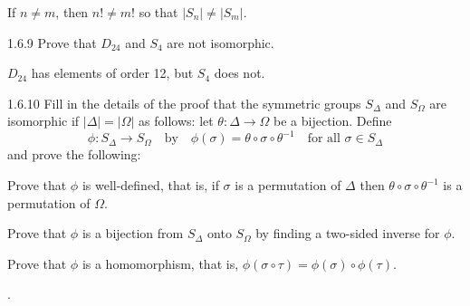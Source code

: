 \begin{sol}
    If $n \neq m$, then $n! \neq m!$ so that $|S_n| \neq |S_m|$.
\end{sol}

\begin{exercise}{1.6.9}
    Prove that $D_{24}$ and $S_4$ are not isomorphic.
\end{exercise}

\begin{sol}
    $D_{24}$ has elements of order 12, but $S_4$ does not.
\end{sol}

\begin{exercise}{1.6.10}
    Fill in the details of the proof that the symmetric groups $S_\Delta$ and $S_\Omega$ are isomorphic if $|\Delta| = |\Omega|$ as follows: let $\theta : \Delta \to \Omega$ be a bijection.
	Define
    \[
        \phi : S_\Delta \to S_\Omega \quad \text{by} \quad \phi(\sigma) = \theta \circ \sigma \circ \theta^{-1} \quad \text{for all } \sigma \in S_\Delta
    \]
    and prove the following:
    \begin{subexercises}
        \item Prove that $\phi$ is well-defined, that is, if $\sigma$ is a permutation of $\Delta$ then $\theta \circ \sigma \circ \theta^{-1}$ is a permutation of $\Omega$.
        \item Prove that $\phi$ is a bijection from $S_\Delta$ onto $S_\Omega$ by finding a two-sided inverse for $\phi$.
        \item Prove that $\phi$ is a homomorphism, that is, $\phi(\sigma \circ \tau) = \phi(\sigma) \circ \phi(\tau)$.
    \end{subexercises}
    .
\end{exercise}

